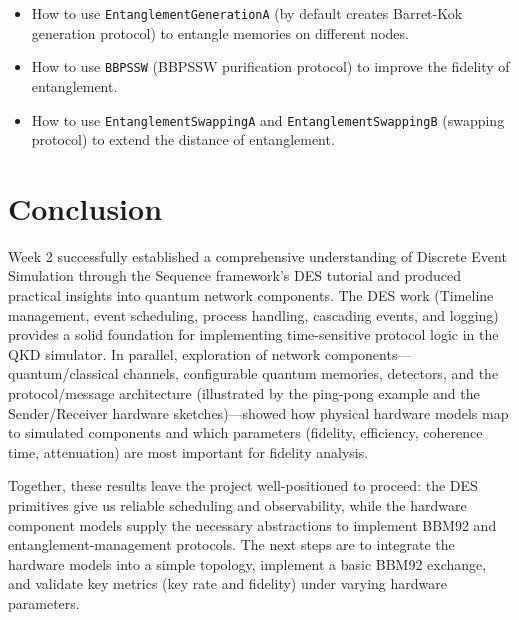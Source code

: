 \begin{itemize}
    \item How to use \texttt{EntanglementGenerationA} (by default creates Barret-Kok generation protocol) to entangle memories on different nodes.
    \item How to use \texttt{BBPSSW} (BBPSSW purification protocol) to improve the fidelity of entanglement.
    \item How to use \texttt{EntanglementSwappingA} and \texttt{EntanglementSwappingB} (swapping protocol) to extend the distance of entanglement.
\end{itemize}

\section{Conclusion}

Week 2 successfully established a comprehensive understanding of Discrete Event Simulation through the Sequence framework's DES tutorial and produced practical insights into quantum network components. The DES work (Timeline management, event scheduling, process handling, cascading events, and logging) provides a solid foundation for implementing time-sensitive protocol logic in the QKD simulator. In parallel, exploration of network components—quantum/classical channels, configurable quantum memories, detectors, and the protocol/message architecture (illustrated by the ping-pong example and the Sender/Receiver hardware sketches)—showed how physical hardware models map to simulated components and which parameters (fidelity, efficiency, coherence time, attenuation) are most important for fidelity analysis.

Together, these results leave the project well-positioned to proceed: the DES primitives give us reliable scheduling and observability, while the hardware component models supply the necessary abstractions to implement BBM92 and entanglement-management protocols. The next steps are to integrate the hardware models into a simple topology, implement a basic BBM92 exchange, and validate key metrics (key rate and fidelity) under varying hardware parameters.


\newpage
{}



